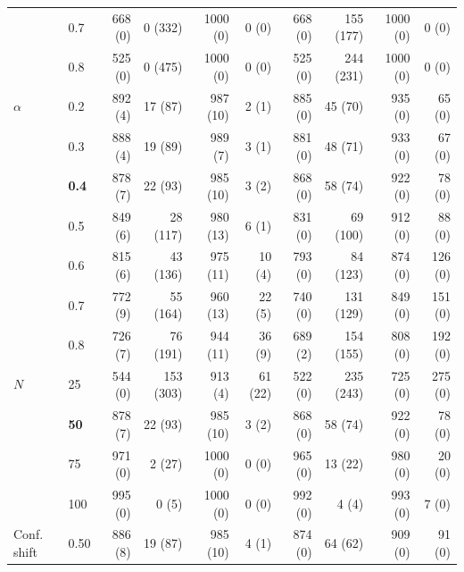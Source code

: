 \begin{table}[htbp]
\begin{tabular}{ll|rr|rr|rr|rr}
 & 0.7 & 668 (0) & 0 (332) & 1000 (0) & 0 (0) & 668 (0) & 155 (177) & 1000 (0) & 0 (0) \\
 & 0.8 & 525 (0) & 0 (475) & 1000 (0) & 0 (0) & 525 (0) & 244 (231) & 1000 (0) & 0 (0) \\
\hline
$\alpha$ & 0.2 & 892 (4) & 17 (87) & 987 (10) & 2 (1) & 885 (0) & 45 (70) & 935 (0) & 65 (0) \\
 & 0.3 & 888 (4) & 19 (89) & 989 (7) & 3 (1) & 881 (0) & 48 (71) & 933 (0) & 67 (0) \\
 & \textbf{0.4} & 878 (7) & 22 (93) & 985 (10) & 3 (2) & 868 (0) & 58 (74) & 922 (0) & 78 (0) \\
 & 0.5 & 849 (6) & 28 (117) & 980 (13) & 6 (1) & 831 (0) & 69 (100) & 912 (0) & 88 (0) \\
 & 0.6 & 815 (6) & 43 (136) & 975 (11) & 10 (4) & 793 (0) & 84 (123) & 874 (0) & 126 (0) \\
 & 0.7 & 772 (9) & 55 (164) & 960 (13) & 22 (5) & 740 (0) & 131 (129) & 849 (0) & 151 (0) \\
 & 0.8 & 726 (7) & 76 (191) & 944 (11) & 36 (9) & 689 (2) & 154 (155) & 808 (0) & 192 (0) \\
\hline
$N$ & 25 & 544 (0) & 153 (303) & 913 (4) & 61 (22) & 522 (0) & 235 (243) & 725 (0) & 275 (0) \\
 & \textbf{50} & 878 (7) & 22 (93) & 985 (10) & 3 (2) & 868 (0) & 58 (74) & 922 (0) & 78 (0) \\
 & 75 & 971 (0) & 2 (27) & 1000 (0) & 0 (0) & 965 (0) & 13 (22) & 980 (0) & 20 (0) \\
 & 100 & 995 (0) & 0 (5) & 1000 (0) & 0 (0) & 992 (0) & 4 (4) & 993 (0) & 7 (0) \\
\hline
Conf. shift & 0.50 & 886 (8) & 19 (87) & 985 (10) & 4 (1) & 874 (0) & 64 (62) & 909 (0) & 91 (0) \\
\hline
\end{tabular}
\begin{flushleft}

\end{flushleft}
\end{table}
